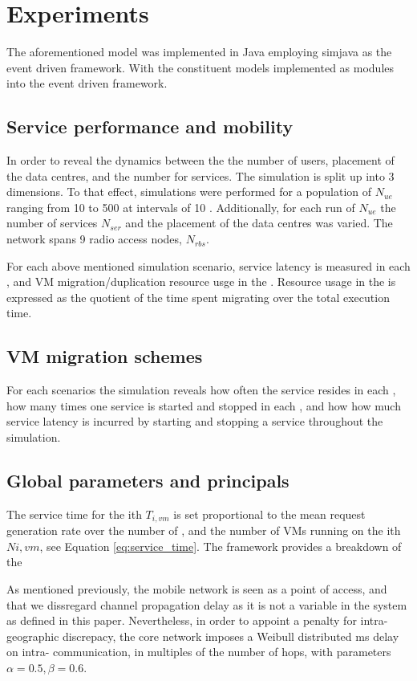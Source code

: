\section{Experiments}
The aforementioned model was implemented in Java employing simjava \cite{SimJava} as the event driven framework. With the constituent models implemented as modules into the event driven framework.

\subsection{Service performance and mobility}

In order to reveal the dynamics between the the number of users, placement of the data centres, and the number for services. The simulation is split up into 3 dimensions. To that effect, simulations were performed for a population of \ues{} $N_{ue}$ ranging from 10 to 500 \ues{} at intervals of 10 \ues{}. Additionally, for each run of $N_{ue}$ the number of services $N_{ser}$ and the placement of the data centres was varied. The network spans 9 radio access nodes, $N_{rbs}$.

For each above mentioned simulation scenario, service latency is measured in each \ue{}, and VM migration/duplication resource usge in the \dc{}. Resource usage in the \dcs{} is expressed as the quotient of the time spent migrating over the total execution time.

\subsection{VM migration schemes}
For each scenarios the simulation reveals how often the service resides in each \dc{}, how many times one service is started and stopped in each \dc{}, and how how much service latency is incurred by starting and stopping a service throughout the simulation.

\subsection{Global parameters and principals}
The \dc{} service time for the ith \dc{} $T_{i,vm}$ is set proportional to the mean request generation rate over the number of \rbss{}, and the number of VMs running on the ith \dc{} $N{i,vm}$, see Equation \ref{eq:service_time}. The framework provides a breakdown of the 

As mentioned previously, the mobile network is seen as a point of access, and that we dissregard channel propagation delay as it is not a variable in the \xcloud system as defined in this paper. Nevertheless, in order to appoint a penalty for intra-\dc{} geographic discrepacy, the core network imposes a Weibull distributed ms delay on intra-\dc{} communication, in multiples of the number of hops, with parameters $\alpha=0.5, \beta=0.6$.

